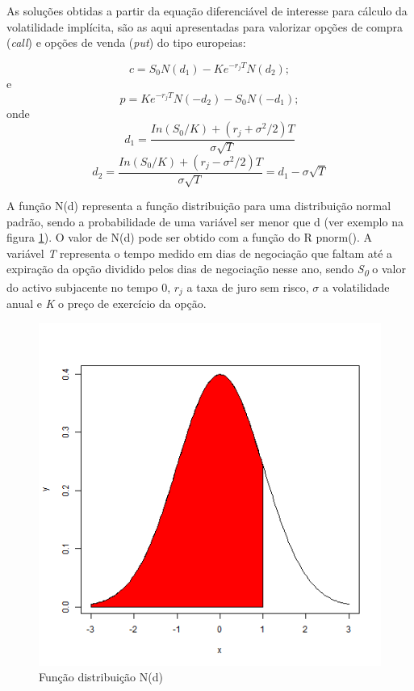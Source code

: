 \documentclass[
  12pt,
  a4paper,
  openany]{book}
\theoremstyle{definition}
\theoremstyle{definition}
\theoremstyle{definition}
\theoremstyle{remark}
\begin{document}
As soluções obtidas a partir da equação diferenciável de interesse para cálculo da volatilidade implícita, são as aqui apresentadas para valorizar opções de compra (\emph{call}) e opções de venda (\emph{put}) do tipo europeias:

\begin{equation} 
  c = S_0N(d_1) - Ke^{-r_{j}T}N(d_2);
  \label{eq:call}
\end{equation}
e
\begin{equation} 
  p = Ke^{-r_{j}T}N(-d_2) - S_0N(-d_1);
  \label{eq:put}
\end{equation}
onde
\begin{equation} 
  d_1 = \frac{In(S_0/K)+(r_{j}+\sigma^2/2)T}{\sigma\sqrt{T}}
  \label{eq:d1}
\end{equation}
\begin{equation} 
  d_2 = \frac{In(S_0/K)+(r_{j}-\sigma^2/2)T}{\sigma\sqrt{T}}=d_1-\sigma\sqrt{T}
  \label{eq:d2}
\end{equation}

A função N(d) representa a função distribuição para uma distribuição normal padrão, sendo a probabilidade de uma variável ser menor que d (ver exemplo na figura \ref{fig:fdistribuicao}). O valor de N(d) pode ser obtido com a função do R pnorm(). A variável \emph{T} representa o tempo medido em dias de negociação que faltam até a expiração da opção dividido pelos dias de negociação nesse ano, sendo \emph{S\textsubscript{0}} o valor do activo subjacente no tempo 0, \emph{\(r_j\)} a taxa de juro sem risco, \(\sigma\) a volatilidade anual e \emph{K} o preço de exercício da opção.

\begin{figure}

{\centering \includegraphics[width=0.45\linewidth]{image/fdistribuicao} 

}

\caption{Função distribuição N(d)}\label{fig:fdistribuicao}
\end{figure}
\FloatBarrier
\centering
\end{document}
